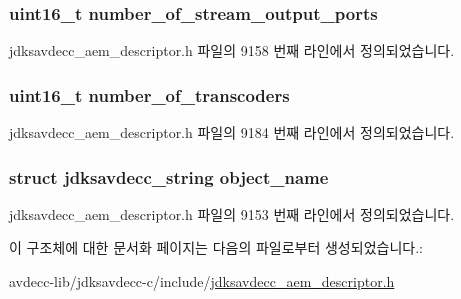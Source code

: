 \subsubsection[{\texorpdfstring{number\+\_\+of\+\_\+stream\+\_\+output\+\_\+ports}{number_of_stream_output_ports}}]{\setlength{\rightskip}{0pt plus 5cm}uint16\+\_\+t number\+\_\+of\+\_\+stream\+\_\+output\+\_\+ports}\hypertarget{structjdksavdecc__descriptor__video__unit_a6b331604e3f2b2db126dbf0a7c81b0fa}{}\label{structjdksavdecc__descriptor__video__unit_a6b331604e3f2b2db126dbf0a7c81b0fa}


jdksavdecc\+\_\+aem\+\_\+descriptor.\+h 파일의 9158 번째 라인에서 정의되었습니다.

\subsubsection[{\texorpdfstring{number\+\_\+of\+\_\+transcoders}{number_of_transcoders}}]{\setlength{\rightskip}{0pt plus 5cm}uint16\+\_\+t number\+\_\+of\+\_\+transcoders}\hypertarget{structjdksavdecc__descriptor__video__unit_ad9030c572f8891febbc6108f96772835}{}\label{structjdksavdecc__descriptor__video__unit_ad9030c572f8891febbc6108f96772835}


jdksavdecc\+\_\+aem\+\_\+descriptor.\+h 파일의 9184 번째 라인에서 정의되었습니다.

\subsubsection[{\texorpdfstring{object\+\_\+name}{object_name}}]{\setlength{\rightskip}{0pt plus 5cm}struct {\bf jdksavdecc\+\_\+string} object\+\_\+name}\hypertarget{structjdksavdecc__descriptor__video__unit_a7d1f5945a13863b1762fc6db74fa8f80}{}\label{structjdksavdecc__descriptor__video__unit_a7d1f5945a13863b1762fc6db74fa8f80}


jdksavdecc\+\_\+aem\+\_\+descriptor.\+h 파일의 9153 번째 라인에서 정의되었습니다.



이 구조체에 대한 문서화 페이지는 다음의 파일로부터 생성되었습니다.\+:\begin{DoxyCompactItemize}
\item 
avdecc-\/lib/jdksavdecc-\/c/include/\hyperlink{jdksavdecc__aem__descriptor_8h}{jdksavdecc\+\_\+aem\+\_\+descriptor.\+h}\end{DoxyCompactItemize}
